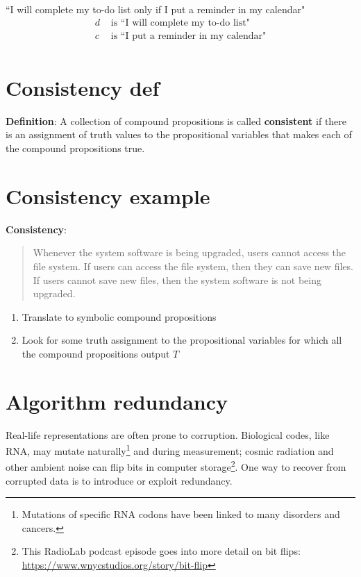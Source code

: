 \documentclass[12pt, oneside]{article}
\begin{document}
\begin{multicols}{2}
``I will complete my to-do list only if I put a reminder in my calendar"
\columnbreak
\begin{align*}
d &\text{ is  ``I will complete my to-do list"} \\
c &\text{ is  ``I put a reminder in my calendar"} \\
\end{align*}
\end{multicols}
\vfill \vfill
\section*{Consistency def}


{\bf Definition}: A collection of  compound  propositions
is called {\bf consistent} if  there
is  an assignment  of  truth values
to  the  propositional variables that makes
each of the compound propositions  true.
 \vfill
\section*{Consistency example}


{\bf Consistency}: 
\begin{quote}
Whenever the system software is being upgraded, users cannot access the file system. 
If users can access the file system, then they can save new files. 
If users cannot save new files, then the system software is not being upgraded.
\end{quote}

\begin{enumerate}
\item Translate to symbolic compound propositions
\vfill
\item Look for some truth assignment to the propositional variables for which all the compound propositions output $T$
\vfill
\end{enumerate} \vfill
\section*{Algorithm redundancy}


Real-life representations are often prone to corruption.  Biological codes, like RNA, 
may mutate naturally\footnote{Mutations of specific RNA codons have been linked to many disorders and cancers.}
and during measurement; cosmic radiation and other ambient noise 
can flip bits in computer storage\footnote{This RadioLab podcast episode
goes into more detail on bit flips: \url{https://www.wnycstudios.org/story/bit-flip}}. 
One way to recover from corrupted data is to introduce or exploit redundancy. 
\end{document}
